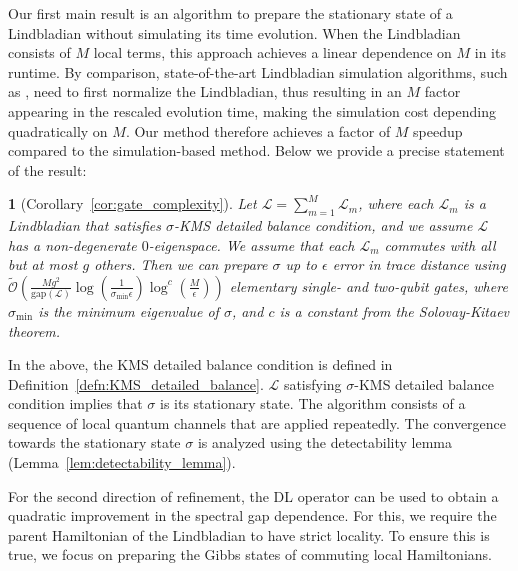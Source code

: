 \documentclass{article}
\newtheorem{thm}{\protect\theoremname}
\theoremstyle{plain}
\theoremstyle{plain}
\theoremstyle{plain}
\theoremstyle{plain}
\theoremstyle{plain}
\theoremstyle{plain}
\theoremstyle{plain}
\providecommand{\theoremname}{Theorem}
\newcommand{\wt}{\widetilde}
\newcommand{\Or}{\mathcal{O}}
\begin{document}
Our first main result is an algorithm to prepare the stationary state of a Lindbladian without simulating its time evolution. When the Lindbladian consists of $M$ local terms, this approach achieves a linear dependence on $M$ in its runtime. By comparison, state-of-the-art Lindbladian simulation algorithms, such as \cite{DingLiLin2024simulating}, need to first normalize the Lindbladian, thus resulting in an $M$ factor appearing in the rescaled evolution time, making the simulation cost depending quadratically on $M$. Our method therefore achieves a factor of $M$ speedup compared to the simulation-based method. Below we provide a precise statement of the result:
\begin{thm}[Corollary~\ref{cor:gate_complexity}]
\label{thm:gate_complexity_main}
    Let $\mathcal{L}=\sum_{m=1}^M \mathcal{L}_m$, where each $\mathcal{L}_m$ is a Lindbladian that satisfies $\sigma$-KMS detailed balance condition, and we assume $\mathcal{L}$ has a non-degenerate $0$-eigenspace. We assume that each $\mathcal{L}_m$ commutes with all but at most $g$ others. Then we can prepare $\sigma$ up to $\epsilon$ error in trace distance using $\wt{\Or}\left(\frac{M g^2}{\mathrm{gap}(\mathcal{L})}\log\left(\frac{1}{\sigma_{\min}\epsilon}\right)\log^c\left(\frac{M}{\epsilon}\right)\right)$ elementary single- and two-qubit gates, where $\sigma_{\min}$ is the minimum eigenvalue of $\sigma$, and $c$ is a constant from the Solovay-Kitaev theorem.
\end{thm}
In the above, the KMS detailed balance condition is defined in Definition~\ref{defn:KMS_detailed_balance}. $\mathcal{L}$ satisfying $\sigma$-KMS detailed balance condition implies that $\sigma$ is its stationary state. The algorithm consists of a sequence of local quantum channels that are applied repeatedly. The convergence towards the stationary state $\sigma$ is analyzed using the detectability lemma (Lemma~\ref{lem:detectability_lemma}).



For the second direction of refinement, the DL operator can be used to obtain a quadratic improvement in the spectral gap dependence. For this, we require the parent Hamiltonian of the Lindbladian to have strict locality. To ensure this is true, we focus on preparing the Gibbs states of commuting local Hamiltonians. 
\end{document}
